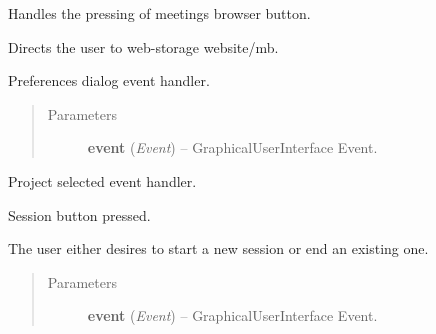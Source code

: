 \documentclass[letterpaper,10pt,english]{sphinxmanual}
\begin{document}
\begin{fulllineitems}
\begin{fulllineitems}
\label{diwacs:diwacs.GraphicalUserInterface.OnMBBtn}
Handles the pressing of meetings browser button.

Directs the user to web-storage website/mb.

\end{fulllineitems}


\begin{fulllineitems}
\label{diwacs:diwacs.GraphicalUserInterface.OnPreferences}
Preferences dialog event handler.
\begin{quote}\begin{description}
\item[{Parameters}] \leavevmode
\textbf{event} (\emph{Event}) -- GraphicalUserInterface Event.

\end{description}\end{quote}

\end{fulllineitems}


\begin{fulllineitems}
\label{diwacs:diwacs.GraphicalUserInterface.OnProjectChanged}
Project selected event handler.

\end{fulllineitems}


\begin{fulllineitems}
\label{diwacs:diwacs.GraphicalUserInterface.OnSession}
Session button pressed.

The user either desires to start a new session or end
an existing one.
\begin{quote}\begin{description}
\item[{Parameters}] \leavevmode
\textbf{event} (\emph{Event}) -- GraphicalUserInterface Event.

\end{description}\end{quote}


\end{fulllineitems}
\end{fulllineitems}
\end{document}
